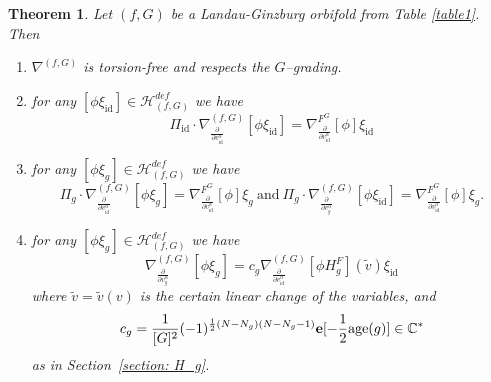 \documentclass[reqno,12pt]{amsart}
\numberwithin{equation}{section}
\theoremstyle{plain}
\newtheorem{theorem}{Theorem}
\theoremstyle{definition}
\newcommand{\CC}{{\mathbb{C}}}
\newcommand{\epi}{{\bf e}}
\newcommand{\id}{\mathrm{id}}
\newcommand{\age}{\mathrm{age}}
\def\H{{\mathcal H}}
\def\T{{\mathcal T}}
\numberwithin{equation}{section}
\begin{document}
\begin{theorem}\label{theorem: main}
    Let $(f,G)$ be a Landau-Ginzburg orbifold from Table \ref{table1}. Then
    
    \begin{enumerate}
     \item $\nabla^{(f,G)}$ is torsion-free and respects the $G$--grading.
     \item for any $[\phi \xi_\id] \in \H_{(f,G)}^{def}$ we have
     \[
        \Pi_\id \cdot \nabla_{\frac{\partial}{\partial v^\alpha_\id}}^{(f,G)}[\phi \xi_\id] 
        = 
        \nabla^{F^G}_{\frac{\partial}{\partial v^\alpha_\id}}[\phi] \xi_{\id}
    \] 
     \item for any $[\phi \xi_g] \in \H_{(f,G)}^{def}$ we have
     \[
        \Pi_g \cdot \nabla_{\frac{\partial}{\partial v^\alpha_\id}}^{(f,G)}[\phi \xi_g] 
        = 
        \nabla^{F^G}_{\frac{\partial}{\partial v^\alpha_\id}}[\phi] \xi_g
        \ \text{and} \
        \Pi_g \cdot \nabla_{\frac{\partial}{\partial v^\alpha_g}}^{(f,G)}[\phi \xi_\id] 
        = 
        \nabla^{F^G}_{\frac{\partial}{\partial v^\alpha_\id}}[\phi] \xi_g.
    \]         
     \item for any $[\phi \xi_g] \in \H_{(f,G)}^{def}$ we have
     \[
        \nabla_{\frac{\partial}{\partial v^\alpha_{g}}}^{(f,G)}[\phi \xi_{g}] = c_g \nabla_{\frac{\partial}{\partial v^\alpha_{\id}}}^{(f,G)}[\phi H_g^F] (\widetilde v) \xi_{\id}
    \]         
    where $\widetilde v = \widetilde v(v)$ is the certain linear change of the variables, and 
        \[
            c_g = \frac{1}{[G]^2} (-1)^{\frac{1}{2}(N-N_g)(N-N_g-1)} \epi[- \frac{1}{2}\age (g)] \in \CC^\ast
        \]
        as in Section~\ref{section: H_g}.
    \end{enumerate}
\end{theorem}
\end{document}
